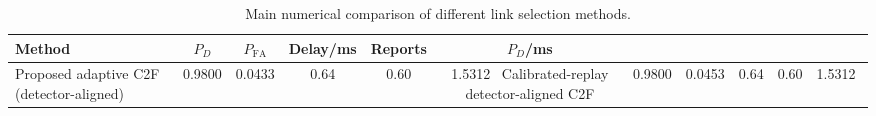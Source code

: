\begin{table}[t]
    \centering
    \caption{Main numerical comparison of different link selection methods.}
    \label{tab:main_summary}
    \begin{tabular}{l c c c c c}
        \hline
        Method & $P_D$ & $P_{\mathrm{FA}}$ & Delay/ms & Reports & $P_D$/ms \\
        \hline
        Proposed adaptive C2F (detector-aligned) & 0.9800 & 0.0433 & 0.64 & 0.60 & 1.5312 \
        Calibrated-replay detector-aligned C2F & 0.9800 & 0.0453 & 0.64 & 0.60 & 1.5312 \
        \hline
    \end{tabular}
\end{table}

